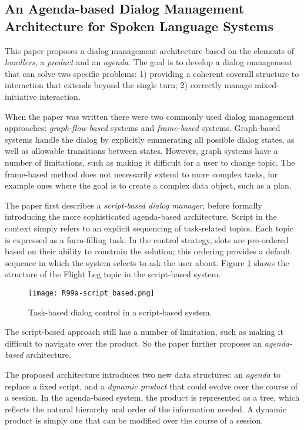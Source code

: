 \subsection{An Agenda-based Dialog Management Architecture for Spoken Language Systems \cite{Rudnicky1999a}}

This paper proposes a dialog management architecture based on the elements of \emph{handlers}, a \emph{product} and an \emph{agenda}. The goal is to develop a dialog management that can solve two specific problems: 1) providing a coherent coverall structure to interaction that extends beyond the single turn; 2) correctly manage mixed-initiative interaction.

When the paper was written there were two commonly used dialog management approaches: \emph{graph-flow based} systems and \emph{frame-based} systems. Graph-based systems handle the dialog by explicitly enumerating all possible dialog states, as well as allowable transitions between states. However, graph systems have a number of limitations, such as making it difficult for a user to change topic. The frame-based method does not necessarily extend to more complex tasks, for example ones where the goal is to create a complex data object, such as a plan.

The paper first describes a \emph{script-based dialog manager}, before formally introducing the more sophisticated agenda-based architecture. Script in the context simply refers to an explicit sequencing of task-related topics. Each topic is expressed as a form-filling task. In the control strategy, slots are pre-ordered based on their ability to constrain the solution; this ordering provides a default sequence in which the system selects to ask the user about. Figure \ref{fig:R99a-script_based} shows the structure of the Flight Leg topic in the script-based system.

\begin{figure}[h]
  \centering
  \texttt{[image: R99a-script\_based.png]}\\
  \caption{Task-based dialog control in a script-based system.}\label{fig:R99a-script_based}
\end{figure}

The script-based approach still has a number of limitation, such as making it difficult to navigate over the product. So the paper further proposes an \emph{agenda-based} architecture.

The proposed architecture introduces two new data structures: an \emph{agenda} to replace a fixed script, and a \emph{dynamic product} that could evolve over the course of a session. In the agenda-based system, the product is represented as a tree, which reflects the natural hierarchy and order of the information needed. A dynamic product is simply one that can be modified over the course of a session.

